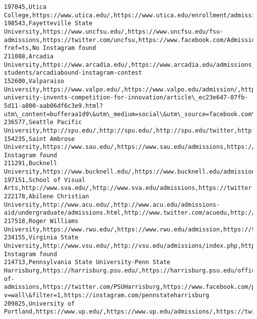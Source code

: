 \documentclass[11pt]{article}
\begin{document}
\begin{Verbatim}[commandchars=\\\{\}]
197045,Utica College,https://www.utica.edu/,https://www.utica.edu/enrollment/admissions/,http://www.twitter.com/uticacollege,http://www.facebook.com/uticacollege,http://instagram.com/uticacollege/
198543,Fayetteville State University,https://www.uncfsu.edu/,https://www.uncfsu.edu/fsu-admissions,https://twitter.com/uncfsu,https://www.facebook.com/Admissions.FSU?fref=ts,No Instagram found
211088,Arcadia University,https://www.arcadia.edu/,https://www.arcadia.edu/admissions,//twitter.com/NBEA,https://www.facebook.com/arcadia.university,/admissions/admitted-students/arcadiabound-instagram-contest
152600,Valparaiso University,https://www.valpo.edu/,https://www.valpo.edu/admission/,http://twitter.com/valpou,http://www.nwitimes.com/news/local/porter/valparaiso-university-invents-competition-for-innovation/article\_ec23e647-07fb-5d11-a800-aab06df6c3e9.html?utm\_content=bufferaa1d9\&utm\_medium=social\&utm\_source=facebook.com\&utm\_campaign=LEEDCC,http://instagram.com/valparaiso\_university\#
236577,Seattle Pacific University,http://spu.edu/,http://spu.edu/,http://spu.edu/twitter,http://spu.edu/facebook,http://spu.edu/instagram
154235,Saint Ambrose University,https://www.sau.edu/,https://www.sau.edu/admissions,https://twitter.com/stambrose,https://www.facebook.com/stambroseuniversity/,No Instagram found
211291,Bucknell University,https://www.bucknell.edu/,https://www.bucknell.edu/admissions,http://twitter.com/BucknellU,http://facebook.com/BucknellU,https://www.instagram.com/BucknellU/
197151,School of Visual Arts,http://www.sva.edu/,http://www.sva.edu/admissions,https://twitter.com/sva\_news,http://www.facebook.com/SchoolOfVisualArts,http://www.instagram.com/SVANYC
222178,Abilene Christian University,http://www.acu.edu/,http://www.acu.edu/admissions-aid/undergraduate/admissions.html,http://www.twitter.com/acuedu,http://www.facebook.com/abilenechristian,http://www.instagram.com/acuedu/
217518,Roger Williams University,https://www.rwu.edu/,https://www.rwu.edu/admission,https://twitter.com/myrwu,https://www.facebook.com/myrwu,https://www.instagram.com/myrwu
234155,Virginia State University,http://www.vsu.edu/,http://vsu.edu/admissions/index.php,https://twitter.com/\#!/VSUTrojans,http://www.facebook.com/VirginiaStateUniversity,No Instagram found
214713,Pennsylvania State University-Penn State Harrisburg,https://harrisburg.psu.edu/,https://harrisburg.psu.edu/office-of-admissions,https://twitter.com/PSUHarrisburg,https://www.facebook.com/pennstateharrisburg?v=wall\&filter=1,https://instagram.com/pennstateharrisburg
209825,University of Portland,https://www.up.edu/,https://www.up.edu/admissions/,https://twitter.com/UPortland,https://www.facebook.com/universityofportland/,https://www.instagram.com/uportland/

\end{Verbatim}
\end{document}

